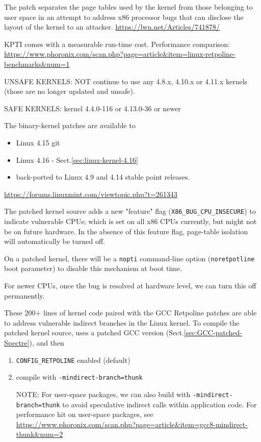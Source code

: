 The patch separates the page tables used by the kernel from those belonging to
user space in an attempt to address x86 processor bugs that can disclose the
layout of the kernel to an attacker.
\url{https://lwn.net/Articles/741878/}

KPTI comes with a measurable run-time cost. 
Performance comparison:
\url{https://www.phoronix.com/scan.php?page=article&item=linux-retpoline-benchmarks&num=1}

UNSAFE KERNELS: NOT continue to use any 4.8.x, 4.10.x or 4.11.x kernels (those
are no longer updated and unsafe).

SAFE KERNELS: kernel 4.4.0-116 or 4.13.0-36 or newer 

The binary-kernel patches are available to 
\begin{itemize}
  \item Linux 4.15 git
  
  \item Linux 4.16 - Sect.\ref{sec:linux-kernel-4.16}
  
  \item back-ported to Linux 4.9 and 4.14 stable point releases.
  
\end{itemize}
\url{https://forums.linuxmint.com/viewtopic.php?t=261343}

The patched kernel source adds a new "feature" flag
(\verb!X86_BUG_CPU_INSECURE!) to indicate vulnerable CPUs; which is set on all
x86 CPUs currently, but might not be on future hardware. In the absence of this
feature flag, page-table isolation will automatically be turned off.

On a patched kernel, there will be a \verb!nopti! command-line option
(\verb!noretpotline! boot parameter) to disable this mechanism at boot time. 

For newer CPUs, once the bug is resolved at hardware level, we can turn this
off permanently.

These 200+ lines of kernel code paired with the GCC Retpoline patches are able
to address vulnerable indirect branches in the Linux kernel. 
To compile the patched kernel source, uses a patched GCC version
(Sect.\ref{sec:GCC-patched-Spectre}), and then
\begin{enumerate}
  \item \verb!CONFIG_RETPOLINE!  enabled (default)
  
  \item compile with \verb!-mindirect-branch=thunk!
  
NOTE: For user-space packages, we can also build with
\verb!-mindirect-branch=thunk! to avoid speculative indirect calls within
application code. For performance hit on user-space packages, see
\url{https://www.phoronix.com/scan.php?page=article&item=gcc8-mindirect-thunk&num=2}
\end{enumerate}

